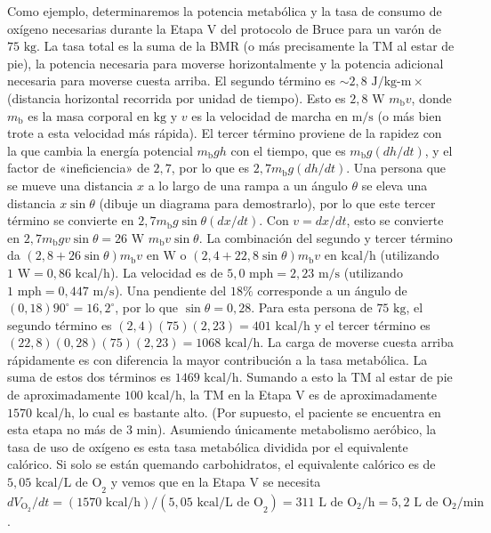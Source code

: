 \documentclass[12pt]{book}
\begin{document}
Como ejemplo, determinaremos la potencia metabólica y la tasa de consumo de oxígeno necesarias durante la Etapa V del protocolo de Bruce para un varón de $75\text{ kg}$. La tasa total es la suma de la BMR (o más precisamente la TM al estar de pie), la potencia necesaria para moverse horizontalmente y la potencia adicional necesaria para moverse cuesta arriba. El segundo término es $\sim 2,8\text{ J/kg-m} \times$ (distancia horizontal recorrida por unidad de tiempo). Esto es $2,8\text{ W } m_{\text{b}} v$, donde $m_{\text{b}}$ es la masa corporal en $\text{kg}$ y $v$ es la velocidad de marcha en $\text{m/s}$ (o más bien trote a esta velocidad más rápida). El tercer término proviene de la rapidez con la que cambia la energía potencial $m_{\text{b}}gh$ con el tiempo, que es $m_{\text{b}}g(dh/dt)$, y el factor de «ineficiencia» de $2,7$, por lo que es $2,7 m_{\text{b}}g(dh/dt)$. Una persona que se mueve una distancia $x$ a lo largo de una rampa a un ángulo $\theta$ se eleva una distancia $x \sin \theta$ (dibuje un diagrama para demostrarlo), por lo que este tercer término se convierte en $2,7 m_{\text{b}}g \sin \theta (dx/dt)$. Con $v = dx/dt$, esto se convierte en $2,7 m_{\text{b}}gv \sin \theta = 26\text{ W } m_{\text{b}}v \sin \theta$. La combinación del segundo y tercer término da $(2,8 + 26 \sin \theta) m_{\text{b}}v$ en $\text{W}$ o $(2,4 + 22,8 \sin \theta) m_{\text{b}}v$ en $\text{kcal/h}$ (utilizando $1\text{ W} = 0,86\text{ kcal/h}$). La velocidad es de $5,0\text{ mph} = 2,23\text{ m/s}$ (utilizando $1\text{ mph} = 0,447\text{ m/s}$). Una pendiente del $18\%$ corresponde a un ángulo de $(0,18)90^\circ = 16,2^\circ$, por lo que $\sin \theta = 0,28$. Para esta persona de $75\text{ kg}$, el segundo término es $(2,4)(75)(2,23) = 401\text{ kcal/h}$ y el tercer término es $(22,8)(0,28)(75)(2,23) = 1068\text{ kcal/h}$. La carga de moverse cuesta arriba rápidamente es con diferencia la mayor contribución a la tasa metabólica. La suma de estos dos términos es $1469\text{ kcal/h}$. Sumando a esto la TM al estar de pie de aproximadamente $100\text{ kcal/h}$, la TM en la Etapa V es de aproximadamente $1570\text{ kcal/h}$, lo cual es bastante alto. (Por supuesto, el paciente se encuentra en esta etapa no más de $3\text{ min}$). Asumiendo únicamente metabolismo aeróbico, la tasa de uso de oxígeno es esta tasa metabólica dividida por el equivalente calórico. Si solo se están quemando carbohidratos, el equivalente calórico es de $5,05\text{ kcal/L de O}_2$ y vemos que en la Etapa V se necesita $d V_{\text{O}_2}/dt = (1570\text{ kcal/h}) / (5,05\text{ kcal/L de O}_2) = 311\text{ L de O}_2\text{/h} = 5,2\text{ L de O}_2\text{/min}$.
\end{document}
